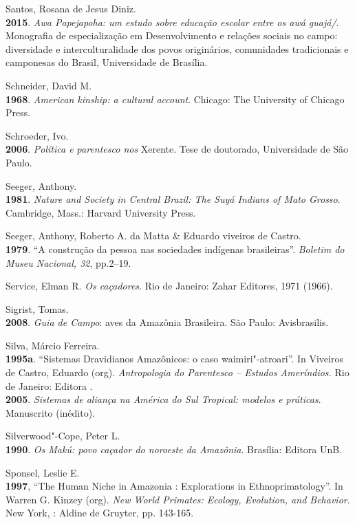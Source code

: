 \begin{Parskip}
Santos, Rosana de Jesus Diniz.\\
\textbf{2015}. \emph{Awa Papejapoha: um estudo sobre educação escolar
entre os awá guajá/}. Monografia de especialização em Desenvolvimento
e relações sociais no campo: diversidade e interculturalidade dos povos
originários, comunidades tradicionais e camponesas do Brasil,
Universidade de Brasília.

Schneider, David M.\\
\textbf{1968}. \emph{American kinship: a cultural account}. Chicago: The
University of Chicago Press.

Schroeder, Ivo.\\
\textbf{2006}. \emph{Política e parentesco nos} Xerente. Tese de
doutorado, Universidade de São Paulo.

Seeger, Anthony.\\
\textbf{1981}. \emph{Nature and Society in Central Brazil: The Suyá
Indians of Mato Grosso}. Cambridge, Mass.: Harvard University Press.

Seeger, Anthony, Roberto A. da Matta \& Eduardo viveiros de Castro.\\
\textbf{1979}. ``A construção da pessoa nas sociedades indígenas
brasileiras''. \emph{Boletim do Museu Nacional, 32}, pp.2--19.

Service, Elman R. \emph{Os caçadores}. Rio de Janeiro: Zahar Editores,
1971 (1966).

Sigrist, Tomas.\\
\textbf{2008}. \emph{Guia de Campo}: aves da Amazônia Brasileira. São
Paulo: Avisbrasilis.

Silva, Márcio Ferreira.\\
\textbf{1995a}. ``Sistemas Dravidianos Amazônicos: o caso
waimiri"-atroari''. In Viveiros de Castro, Eduardo (org).
\emph{Antropologia do Parentesco -- Estudos Ameríndios.} Rio de Janeiro:
Editora .\\
\textbf{2005}. \emph{Sistemas de aliança na América do Sul Tropical:
modelos e práticas}. Manuscrito (inédito).

Silverwood"-Cope, Peter L.\\
\textbf{1990}. \emph{Os Makú: povo caçador do noroeste da Amazônia}.
Brasília: Editora UnB.

Sponsel, Leslie E.\\
\textbf{1997}, ``The Human Niche in Amazonia : Explorations in
Ethnoprimatology''. In Warren G. Kinzey (org). \emph{New World Primates:
Ecology, Evolution, and Behavior}. New York, : Aldine de Gruyter, pp.
143-165.


\end{Parskip}

